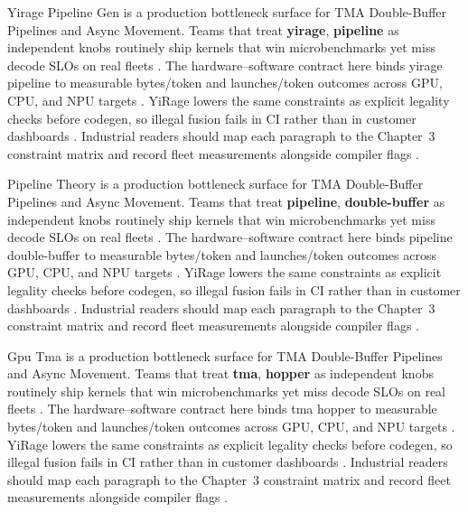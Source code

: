 Yirage Pipeline Gen is a production bottleneck surface for TMA Double-Buffer Pipelines and Async Movement. Teams that treat \textbf{yirage}, \textbf{pipeline} as independent knobs routinely ship kernels that win microbenchmarks yet miss decode SLOs on real fleets \citep{taxbreak2026,semianalysis2024tma}. The hardware--software contract here binds yirage pipeline to measurable bytes/token and launches/token outcomes across GPU, CPU, and NPU targets \citep{memoryfloor2026,amd2024xdna}. YiRage lowers the same constraints as explicit legality checks before codegen, so illegal fusion fails in CI rather than in customer dashboards \citep{nvidia2022hopper,amd2024aie}. Industrial readers should map each paragraph to the Chapter~3 constraint matrix and record fleet measurements alongside compiler flags \citep{semianalysis2024tma,dlbook}.

Pipeline Theory is a production bottleneck surface for TMA Double-Buffer Pipelines and Async Movement. Teams that treat \textbf{pipeline}, \textbf{double-buffer} as independent knobs routinely ship kernels that win microbenchmarks yet miss decode SLOs on real fleets \citep{memoryfloor2026,amd2024xdna}. The hardware--software contract here binds pipeline double-buffer to measurable bytes/token and launches/token outcomes across GPU, CPU, and NPU targets \citep{nvidia2022hopper,amd2024aie}. YiRage lowers the same constraints as explicit legality checks before codegen, so illegal fusion fails in CI rather than in customer dashboards \citep{semianalysis2024tma,dlbook}. Industrial readers should map each paragraph to the Chapter~3 constraint matrix and record fleet measurements alongside compiler flags \citep{amd2024xdna,dao2022flashattention}.

Gpu Tma is a production bottleneck surface for TMA Double-Buffer Pipelines and Async Movement. Teams that treat \textbf{tma}, \textbf{hopper} as independent knobs routinely ship kernels that win microbenchmarks yet miss decode SLOs on real fleets \citep{nvidia2022hopper,amd2024aie}. The hardware--software contract here binds tma hopper to measurable bytes/token and launches/token outcomes across GPU, CPU, and NPU targets \citep{semianalysis2024tma,dlbook}. YiRage lowers the same constraints as explicit legality checks before codegen, so illegal fusion fails in CI rather than in customer dashboards \citep{amd2024xdna,dao2022flashattention}. Industrial readers should map each paragraph to the Chapter~3 constraint matrix and record fleet measurements alongside compiler flags \citep{amd2024aie,kwon2023vllm}.

